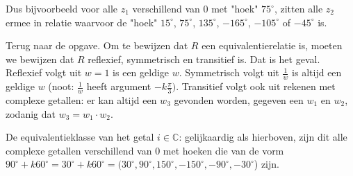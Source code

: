 \documentclass[a4paper]{article}
\begin{document}
 Dus bijvoorbeeld voor alle $z_1$ verschillend van $0$ met "hoek" $75^{\circ}$, zitten alle $z_2$ ermee in relatie waarvoor de "hoek" $15^{\circ}$, $75^{\circ}$, $135^{\circ}$, $-165 ^{\circ}$, $-105^{\circ}$ of $-45^{\circ}$ is. 

Terug naar de opgave. 
Om te bewijzen dat $R$ een equivalentierelatie is, moeten we bewijzen dat $R$ reflexief, symmetrisch en transitief is. Dat is het geval. Reflexief volgt uit $w=1$ is een geldige $w$. Symmetrisch volgt uit $\frac{1}{w}$ is altijd een geldige $w$ (noot: $\frac{1}{w}$ heeft argument $-k\frac{\pi}{3})$. Transitief volgt ook uit rekenen met complexe getallen: er kan altijd een $w_3$ gevonden worden, gegeven een $w_1$ en $w_2$, zodanig dat $w_3 = w_1 \cdot w_2$. 

De equivalentieklasse van het getal $i \in \mathbb{C}$: gelijkaardig als hierboven, zijn dit alle complexe getallen verschillend van $0$ met hoeken die van de vorm $90^{\circ} + k60^{\circ} = 30^{\circ} + k60^{\circ} = (30^{\circ}, 90^{\circ}, 150^{\circ}, -150^{\circ}, -90^{\circ}, -30^{\circ}$) zijn. 
\end{document}
